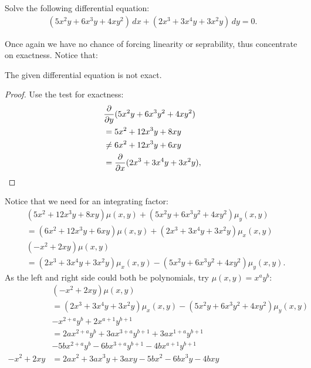 \documentclass{article}
\begin{document}
\newpage
\begin{problem}
    Solve the following differential equation:
    \begin{align*}
        (5x^2y + 6x^3y + 4xy^2)\, dx + (2x^3 + 3x^4y + 3x^2y)\, dy= 0.
    \end{align*}
\end{problem}
\begin{solution*}
    Once again we have no chance of forcing linearity or seprability, thus concentrate on exactness. Notice that:
    \begin{lemma}
        The given differential equation is not exact.
    \end{lemma}
    \begin{proof}
        Use the test for exactness:
        \begin{align*}
            &\dfrac{\partial}{\partial y}(5x^2y + 6x^3y^2 + 4xy^2) \\ 
            &= 5x^2 + 12x^3y + 8xy \\
            &\ne 6x^2 + 12x^3y + 6xy \\  
            &= \dfrac{\partial}{\partial x} (2x^3 + 3x^4y + 3x^2y),
        \end{align*}
    \end{proof}
    Notice that we need for an integrating factor:
    \begin{align*}
        & (5x^2 + 12x^3y + 8xy)\mu(x,y) + (5x^2y + 6x^3y^2 + 4xy^2)\mu_y(x,y) \\ 
        &= (6x^2 + 12x^3y + 6xy)\mu(x,y) + (2x^3 + 3x^4y + 3x^2y)\mu_x(x,y) \\ 
        &(-x^2 + 2xy)\mu(x,y) \\ 
        &= (2x^3 + 3x^4y + 3x^2y)\mu_x(x,y) - (5x^2y + 6x^3y^2 + 4xy^2)\mu_y(x,y).
    \end{align*}
    As the left and right side could both be polynomials, try $\mu(x,y) = x^ay^b$:
    \begin{align*}
        &(-x^2 + 2xy)\mu(x,y) \\ 
        &= (2x^3 + 3x^4y + 3x^2y)\mu_x(x,y) - (5x^2y + 6x^3y^2 + 4xy^2)\mu_y(x,y) \\ 
        &-x^{2+a}y^b + 2x^{a+1}y^{b+1}   \\ 
        &= 2ax^{2+a}y^b + 3ax^{3+a}y^{b+1} + 3ax^{1+a}y^{b+1} \\
        & - 5bx^{2+a}y^b - 6bx^{3+a}y^{b+1} - 4bx^{a+1}y^{b+1} \\ 
        -x^2 + 2xy &= 2ax^2 + 3ax^3y + 3axy- 5bx^2 - 6bx^3y - 4bxy \\ 

\end{align*}
\end{solution*}
\end{document}
